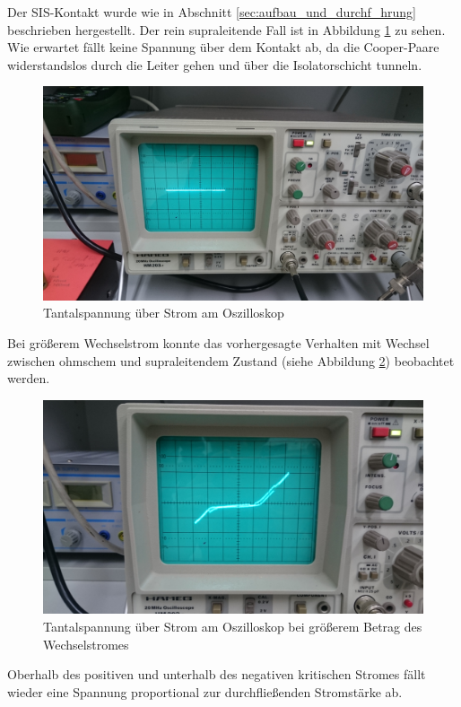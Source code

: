 		Der SIS-Kontakt wurde wie in Abschnitt \ref{sec:aufbau_und_durchf_hrung} beschrieben hergestellt.
		Der rein supraleitende Fall ist in Abbildung \ref{waag_strich} zu sehen. 
		Wie erwartet fällt keine Spannung über dem Kontakt ab, da die Cooper-Paare widerstandslos durch die Leiter gehen und über die Isolatorschicht tunneln.
		\begin{figure}
			\center
			\includegraphics[scale=0.08]{messwerte/DSC_0618.JPG}
			\caption{Tantalspannung über Strom am Oszilloskop}
			\label{waag_strich}
		\end{figure}
		Bei größerem Wechselstrom konnte das vorhergesagte Verhalten mit Wechsel zwischen ohmschem und supraleitendem Zustand (siehe Abbildung \ref{zickzack}) beobachtet werden.
		\begin{figure}
			\center
			\includegraphics[scale=0.08]{messwerte/DSC_0624.JPG}
			\caption{Tantalspannung über Strom am Oszilloskop bei größerem Betrag des Wechselstromes}
			\label{zickzack}
		\end{figure}
		Oberhalb des positiven und unterhalb des negativen kritischen Stromes fällt wieder eine Spannung proportional zur durchfließenden Stromstärke ab.
